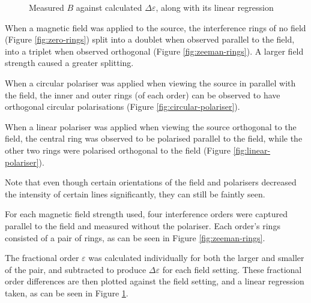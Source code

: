 \documentclass[a4paper]{scrartcl}
\begin{document}
\begin{figure}
    \centering
    \caption{Measured \(B\) against calculated \(\Delta \varepsilon\), along with its linear regression}
    \label{fig:results}
\end{figure}

When a magnetic field was applied to the source, the interference rings of no field (Figure \ref{fig:zero-rings}) split into a doublet when observed parallel to the field, into a triplet when observed orthogonal (Figure \ref{fig:zeeman-rings}). A larger field strength caused a greater splitting.

When a circular polariser was applied when viewing the source in parallel with the field, the inner and outer rings (of each order) can be observed to have orthogonal circular polarisations (Figure \ref{fig:circular-polariser}).

When a linear polariser was applied when viewing the source orthogonal to the field, the central ring was observed to be polarised parallel to the field, while the other two rings were polarised orthogonal to the field (Figure \ref{fig:linear-polariser}).

Note that even though certain orientations of the field and polarisers decreased the intensity of certain lines significantly, they can still be faintly seen.

For each magnetic field strength used, four interference orders were captured parallel to the field and measured without the polariser. Each order's rings consisted of a pair of rings, as can be seen in Figure \ref{fig:zeeman-rings}.

The fractional order \(\varepsilon\) was calculated individually for both the larger and smaller of the pair, and subtracted to produce \(\Delta \varepsilon\) for each field setting. These fractional order differences are then plotted against the field setting, and a linear regression taken, as can be seen in Figure \ref{fig:results}.
\end{document}
